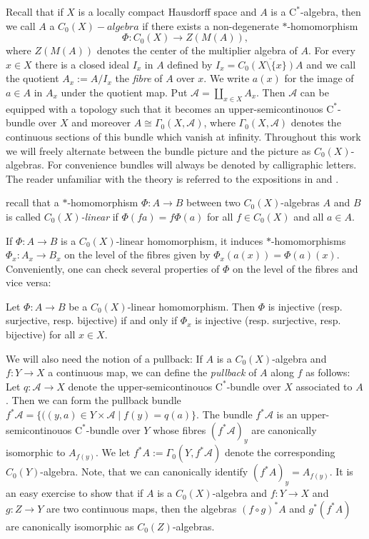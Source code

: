 	Recall that if $X$ is a locally compact Hausdorff space and $A$ is a $\mathrm{C}^*$-algebra, then we call $A$ a $C_0(X)-algebra$ if there exists a non-degenerate $\ast$-homomorphism
	$$\Phi:C_0(X)\rightarrow Z(M(A)),$$ where $Z(M(A))$ denotes the center of the multiplier algebra of $A$. For every $x\in X$ there is a closed ideal $I_x$ in $A$ defined by $I_x=\overline{C_0(X\setminus\lbrace x\rbrace)A}$ and we call the quotient $A_x:=A/I_x$ the \textit{fibre} of $A$ over $x$. We write $a(x)$ for the image of $a\in A$ in $A_x$ under the quotient map. Put $\mathcal{A}=\coprod_{x\in X} A_x$. Then $\mathcal{A}$ can be equipped with a topology such that it becomes an upper-semicontinouos $\mathrm{C}^*$-bundle over $X$ and moreover $A\cong \Gamma_0(X,\mathcal{A})$, where $\Gamma_0(X,\mathcal{A})$ denotes the continuous sections of this bundle which vanish at infinity.
	Throughout this work we will freely alternate between the bundle picture and the picture as $C_0(X)$-algebras. For convenience bundles will always be denoted by calligraphic letters.
	The reader unfamiliar with the theory is referred to the expositions in \cite[Appendix C]{Williams} and \cite[Section~3.1]{Goehle}.
	
	recall that a $\ast$-homomorphism $\Phi:A\rightarrow B$ between two $C_0(X)$-algebras $A$ and $B$ is called \textit{$C_0(X)$-linear} if $\Phi(f a)=f \Phi(a)$ for all $f\in C_0(X)$ and all $a\in A$.
	
	If $\Phi:A\rightarrow B$ is a $C_0(X)$-linear homomorphism, it induces $\ast$-homo\-morphisms $\Phi_x:A_x\rightarrow B_x$ on the level of the fibres given by $\Phi_x(a(x))=\Phi(a)(x)$.
	Conveniently, one can check several properties of $\Phi$ on the level of the fibres and vice versa:
	\begin{lemma}\cite[Lemma~2.1]{MR2820377}\label{Lem:IsomorphismCriteriumForC(X)-linearHomomorphisms}
		Let $\Phi:A\rightarrow B$ be a $C_0(X)$-linear homomorphism. Then $\Phi$ is injective (resp. surjective, resp. bijective) if and only if $\Phi_x$ is injective (resp. surjective, resp. bijective) for all $x\in X$.
	\end{lemma}
	
	We will also need the notion of a pullback: If $A$ is a $C_0(X)$-algebra and $f:Y\rightarrow X$ a continuous map, we can define the \textit{pullback} of $A$ along $f$ as follows:
	Let $q:\mathcal{A}\rightarrow X$ denote the upper-semicontinouos $\mathrm{C}^*$-bundle over $X$ associated to $A$. Then we can form the pullback bundle $f^*\mathcal{A}=\lbrace ((y,a)\in Y\times\mathcal{A}\mid f(y)=q(a)\rbrace$. The bundle $f^*\mathcal{A}$ is an upper-semicontinouos $\mathrm{C}^*$-bundle over $Y$ whose fibres $(f^*\mathcal{A})_y$ are canonically isomorphic to $A_{f(y)}$. We let $f^*A:=\Gamma_0(Y,f^*\mathcal{A})$ denote the corresponding $C_0(Y)$-algebra. Note, that we can canonically identify $(f^*A)_y=A_{f(y)}$.
	It is an easy exercise to show that if $A$ is a $C_0(X)$-algebra and $f:Y\rightarrow X$ and $g:Z\rightarrow Y$ are two continuous maps, then the algebras $(f\circ g)^*A$ and $g^*(f^*A)$ are canonically isomorphic as $C_0(Z)$-algebras.
	
